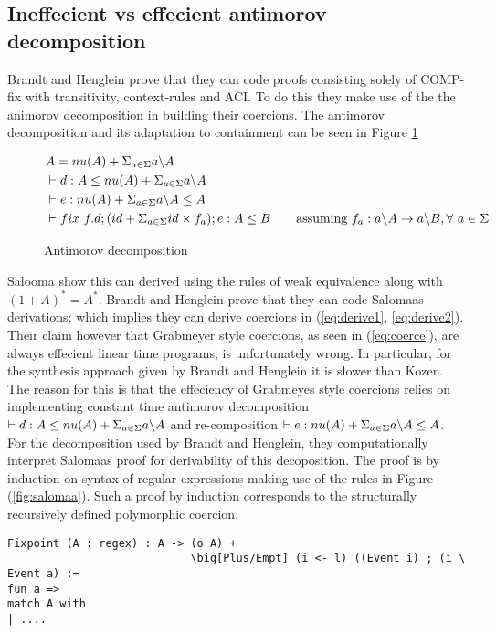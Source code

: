 \documentclass[a4paper,UKenglish,cleveref, autoref, thm-restate]{lipics-v2021}
\begin{document}
\subsection{Ineffecient vs effecient antimorov decomposition}
 Brandt and Henglein prove that they can code proofs consisting solely of COMP-fix with transitivity, context-rules and ACI. To do this they make use of the the animorov decomposition in building their coercions. The antimorov decomposition and its adaptation to containment can be seen in Figure \ref{fig:antimorov}
 \begin{figure}
   \centering
   \begin{align}
&A = \mynu{A} + \Sigma_{a \in \Sigma} \derive{a}{A}\\
&\contains{}{d}{A}{\mynu{A} + \Sigma_{a \in \Sigma} \derive{a}{A}} \label{eq:derive1}\\
&\contains{}{e}{\mynu{A} + \Sigma_{a \in \Sigma} \derive{a}{A}}{A} \label{eq:derive2}\\
&\contains{}{\fix ~f.d;(id + \Sigma_{a \in \Sigma} id\times f_a); e}{A}{B} \qquad \text{assuming }f_a : \derive{a}{A} \rightarrow \derive{a}{B}, \forall ~ a \in \Sigma \label{eq:coerce}
   \end{align}
   \caption{Antimorov decomposition}
   \label{fig:antimorov}
 \end{figure}
Salooma show this can derived using the rules of weak equivalence along with $(1 + A)^* = A^*$. Brandt and Henglein prove that they can code Salomaas derivations; which implies they can derive coercions in (\ref{eq:derive1}, \ref{eq:derive2}). 
Their claim however that Grabmeyer style coercions, as seen in (\ref{eq:coerce}), are always effecient linear time programs, is unfortunately wrong. In particular, for the synthesis approach given by Brandt and Henglein it is slower than Kozen. The reason for this is that the effeciency of Grabmeyes style coercions relies on implementing constant time antimorov decomposition $\contains{}{d}{A}{\mynu{A} + \Sigma_{a \in \Sigma} \derive{a}{A}}$ and re-composition $\contains{}{e}{\mynu{A} + \Sigma_{a \in \Sigma} \derive{a}{A}}{A}$.\\
For the decomposition used by Brandt and Henglein, they computationally interpret Salomaas proof for derivability of this decoposition. The proof is by induction on syntax of regular expressions making use of the rules in Figure (\ref{fig:salomaa}). Such a proof by induction corresponds to the structurally recursively defined polymorphic coercion:
\begin{verbatim}
Fixpoint (A : regex) : A -> (o A) +  
                            \big[Plus/Empt]_(i <- l) ((Event i)_;_(i \ Event a) :=
fun a => 
match A with 
| ....
\end{verbatim}
\end{document}
